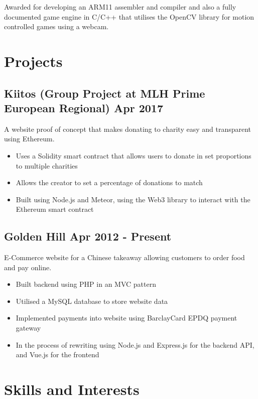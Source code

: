 \documentclass[a4paper]{article}
\begin{document}
Awarded for developing an ARM11 assembler and compiler and also a fully documented game engine in C/C++ that utilises the OpenCV library for motion controlled games using a webcam.

\section*{Projects}

\subsection*{Kiitos \textnormal{(Group Project at MLH Prime European Regional)} \hfill Apr 2017}

A website proof of concept that makes donating to charity easy and transparent using Ethereum.

\begin{itemize}
    \item Uses a Solidity smart contract that allows users to donate in set proportions to multiple charities
    \item Allows the creator to set a percentage of donations to match
    \item Built using Node.js and Meteor, using the Web3 library to interact with the Ethereum smart contract
\end{itemize}

\subsection*{Golden Hill \hfill Apr 2012 - Present}

E-Commerce website for a Chinese takeaway allowing customers to order food and pay online.

\begin{itemize}
    \item Built backend using PHP in an MVC pattern
    \item Utilised a MySQL database to store website data
    \item Implemented payments into website using BarclayCard EPDQ payment gateway
    \item In the process of rewriting using Node.js and Express.js for the backend API, and Vue.js for the frontend
\end{itemize}

\section*{Skills and Interests}
\end{document}
